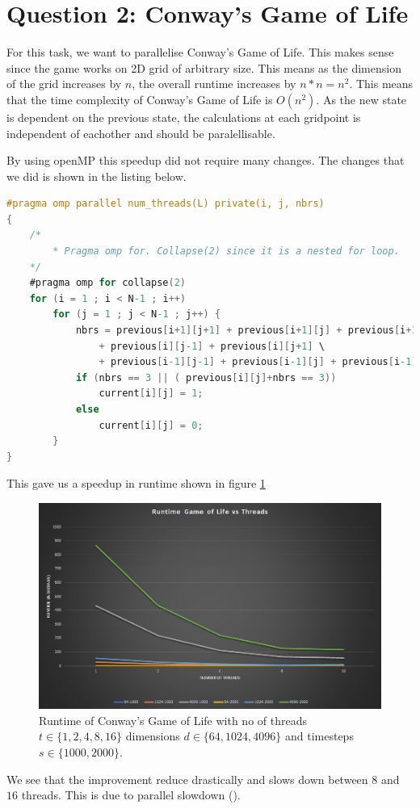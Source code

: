 \section{Question 2: Conway's Game of Life}

For this task, we want to parallelise Conway's Game of Life. 
This makes sense since the game works on 2D grid of arbitrary size. This means 
as the dimension of the grid increases by $n$, the overall runtime increases by
$n*n=n^2$. This means that the time complexity of Conway's Game of Life is 
$O(n^2)$. As the new state is dependent on the previous state, the calculations
at each gridpoint is independent of eachother and should be paralellisable.

By using openMP this speedup did not require many changes. The changes that we did
is shown in the listing below.

\begin{lstlisting}[language=C]
#pragma omp parallel num_threads(L) private(i, j, nbrs)
{
    /*
        * Pragma omp for. Collapse(2) since it is a nested for loop.
    */
    #pragma omp for collapse(2)
    for (i = 1 ; i < N-1 ; i++)
        for (j = 1 ; j < N-1 ; j++) {
            nbrs = previous[i+1][j+1] + previous[i+1][j] + previous[i+1][j-1] \
                + previous[i][j-1] + previous[i][j+1] \
                + previous[i-1][j-1] + previous[i-1][j] + previous[i-1][j+1];
            if (nbrs == 3 || ( previous[i][j]+nbrs == 3))
                current[i][j] = 1;
            else 
                current[i][j] = 0;
        }
}
\end{lstlisting}

This gave us a speedup in runtime shown in figure \ref{fig:cglspeedup}

\begin{figure}
    \centering
    \includegraphics[width=\linewidth]{Figures/Runtimes.png}
    \caption{
        Runtime of Conway's Game of Life with no of threads $t \in \{1,2,4,8,16\}$
        dimensions $d \in \{64,1024,4096\}$ and timesteps $s \in \{1000,2000\}$.
    }
    \label{fig:cglspeedup}
\end{figure}

We see that the improvement reduce drastically and slows down between $8$ and $16$
threads. This is due to parallel slowdown (\cite{enwiki:ppslowdown}).
